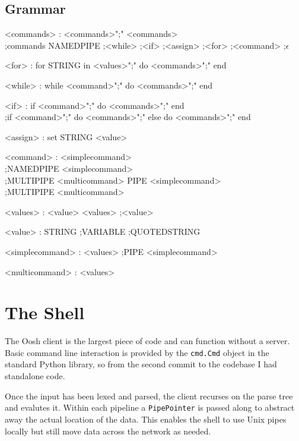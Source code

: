 \documentclass[12pt,twoside,notitlepage]{report}
\begin{document}
\subsection{Grammar}
\begin{grammar}
<commands> : <commands>";" <commands>\\
;commands NAMEDPIPE
;<while>
;<if>
;<assign>
;<for>
;<command>
;$\epsilon$

<for> : for STRING in <values>";" do <commands>";" end

<while> : while <command>";" do <commands>";" end

<if> : if <command>";" do <commands>";" end\\
;if <command>";" do <commands>";" else do <commands>";" end

<assign> : set STRING <value>

<command> : <simplecommand>\\
;NAMEDPIPE <simplecommand>\\
;MULTIPIPE <multicommand> PIPE <simplecommand>\\
;MULTIPIPE <multicommand>

<values> : <value> <values>
;<value>

<value> : STRING
;VARIABLE
;QUOTEDSTRING

<simplecommand> : <values>
;PIPE <simplecommand>
    
<multicommand> : <values>
\end{grammar}

\section{The Shell}
The Oosh client is the largest piece of code %
and can function without a server. Basic command line interaction is provided by
the {\tt cmd.Cmd} object in the standard Python library, so from the second
commit to the codebase I had standalone code. %

Once the input has been lexed and parsed, the client recurses on the parse tree
and evalutes it. Within each pipeline %
a {\tt PipePointer} is passed along to abstract away the actual location of the
data. This enables the shell to use Unix pipes locally %
but still move data across the network as needed.
\end{document}
